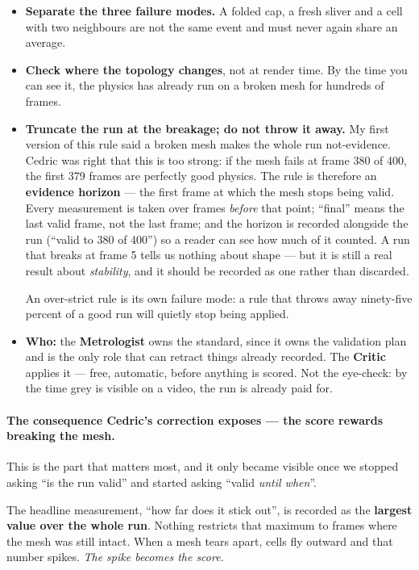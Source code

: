 \documentclass[11pt,a4paper]{article}
\begin{document}
\begin{itemize}
\item \textbf{Separate the three failure modes.} A folded cap, a fresh sliver and a cell with two
neighbours are not the same event and must never again share an average.
\item \textbf{Check where the topology changes}, not at render time. By the time you can see it,
the physics has already run on a broken mesh for hundreds of frames.
\item \textbf{Truncate the run at the breakage; do not throw it away.} My first version of this
rule said a broken mesh makes the whole run not-evidence. Cedric was right that this is too strong:
if the mesh fails at frame 380 of 400, the first 379 frames are perfectly good physics. The rule is
therefore an \textbf{evidence horizon} --- the first frame at which the mesh stops being valid.
Every measurement is taken over frames \emph{before} that point; ``final'' means the last valid
frame, not the last frame; and the horizon is recorded alongside the run (``valid to 380 of 400'')
so a reader can see how much of it counted. A run that breaks at frame 5 tells us nothing about
shape --- but it is still a real result about \emph{stability}, and it should be recorded as one
rather than discarded.

An over-strict rule is its own failure mode: a rule that throws away ninety-five percent of a good
run will quietly stop being applied.
\item \textbf{Who:} the \textbf{Metrologist} owns the standard, since it owns the validation
plan and is the only role that can retract things already recorded. The \textbf{Critic} applies it
--- free, automatic, before anything is scored. Not the eye-check: by the time grey is visible on a
video, the run is already paid for.
\end{itemize}

\paragraph{The consequence Cedric's correction exposes --- the score rewards breaking the mesh.}
This is the part that matters most, and it only became visible once we stopped asking ``is the run
valid'' and started asking ``valid \emph{until when}''.

The headline measurement, ``how far does it stick out'', is recorded as the \textbf{largest value
over the whole run}. Nothing restricts that maximum to frames where the mesh was still intact. When
a mesh tears apart, cells fly outward and that number spikes. \emph{The spike becomes the score.}
\end{document}
